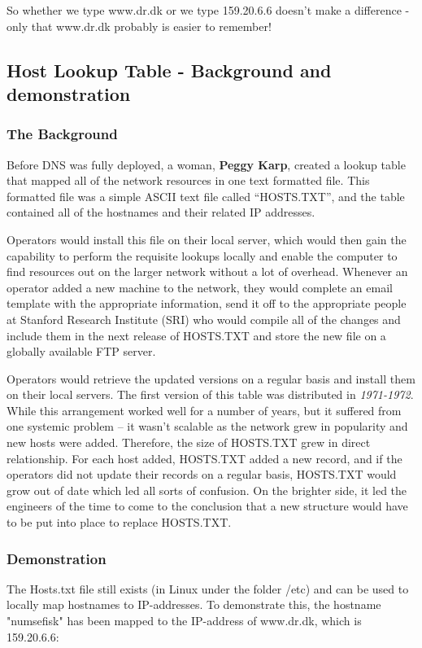 So whether we type www.dr.dk or we type 159.20.6.6 doesn't make a difference - only that www.dr.dk probably is easier to remember! \\

\subsection{Host Lookup Table - Background and demonstration}

\subsubsection{The Background} 
Before DNS was fully deployed, a woman, \textbf{Peggy Karp}, created a lookup table that mapped all of the network resources in one text formatted file. This formatted file was a simple ASCII text file called “HOSTS.TXT”, and the table contained all of the hostnames and their related IP addresses. 

Operators would install this file on their local server, which would then gain the capability to perform the requisite lookups locally and enable the computer to find resources out on the larger network without a lot of overhead. Whenever an operator added a new machine to the network, they would complete an email template with the appropriate information, send it off to the appropriate people at Stanford Research Institute (SRI) who would compile all of the changes and include them in the next release of HOSTS.TXT and store the new file on a globally available FTP server. 

Operators would retrieve the updated versions on a regular basis and install them on their local servers. The first version of this table was distributed in \textit{1971-1972}. While this arrangement worked well for a number of years, but it suffered from one systemic problem – it wasn’t scalable as the network grew in popularity and new hosts were added. Therefore, the size of HOSTS.TXT grew in direct relationship. For each host added, HOSTS.TXT added a new record, and if the operators did not update their records on a regular basis, HOSTS.TXT would grow out of date which led all sorts of confusion. On the brighter side, it led the engineers of the time to come to the conclusion that a new structure would have to be put into place to replace HOSTS.TXT.

\subsubsection{Demonstration}
The Hosts.txt file still exists (in Linux under the folder /etc) and can be used to locally map hostnames to IP-addresses. To demonstrate this, the hostname "numsefisk" has been mapped to the IP-address of www.dr.dk, which is 159.20.6.6:

